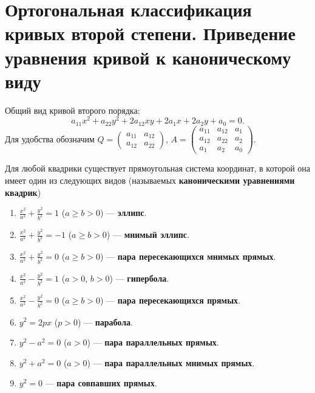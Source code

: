 \section{Ортогональная классификация кривых второй степени. Приведение уравнения кривой к каноническому виду}

Общий вид кривой второго порядка:
$$
a_{11}x^2 + a_{22}y^2 + 2a_{12}xy + 2a_1x + 2a_2y + a_0 = 0.
$$
Для удобства обозначим $Q =
\begin{pmatrix}
    a_{11} & a_{12}\\
    a_{12} & a_{22}
\end{pmatrix}$, $A =
\begin{pmatrix}
    a_{11} & a_{12} & a_1\\
    a_{12} & a_{22} & a_2\\
    a_1 & a_2 & a_0
\end{pmatrix}.$

\begin{theorem}
    Для любой квадрики существует прямоугольная система координат, в которой она имеет один из следующих видов (называемых \textbf{каноническими уравнениями квадрик})
    \begin{enumerate}
        \item $\displaystyle\frac{x^2}{a^2} + \frac{y^2}{b^2} = 1$ ($a \geqslant b > 0$) --- \textbf{эллипс}.
        \item $\displaystyle\frac{x^2}{a^2} + \frac{y^2}{b^2} = -1$ ($a \geqslant b > 0$) --- \textbf{мнимый эллипс}.
        \item $\displaystyle\frac{x^2}{a^2} + \frac{y^2}{b^2} = 0$ ($a \geqslant b > 0$) --- \textbf{пара пересекающихся мнимых прямых}.
        \item $\displaystyle\frac{x^2}{a^2} - \frac{y^2}{b^2} = 1$ ($a > 0$, $b > 0$) --- \textbf{гипербола}.
        \item $\displaystyle\frac{x^2}{a^2} - \frac{y^2}{b^2} = 0$ ($a \geqslant b > 0$) --- \textbf{пара пересекающихся прямых}.
        \item $y^2 = 2px$ ($p > 0$) --- \textbf{парабола}.
        \item $y^2 - a^2 = 0$ ($a > 0$) --- \textbf{пара параллельных прямых}.
        \item $y^2 + a^2 = 0$ ($a > 0$) --- \textbf{пара параллельных мнимых прямых}.
        \item $y^2 = 0$ --- \textbf{пара совпавших прямых}.
    \end{enumerate}
\end{theorem}


